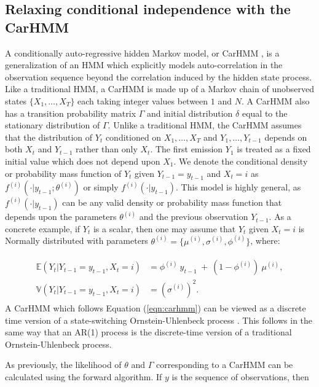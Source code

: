 \subsection{Relaxing conditional independence with the CarHMM}
\label{subsec:CarHMM}

A conditionally auto-regressive hidden Markov model, or CarHMM \citep{Lawler:2019}, is a generalization of an HMM which explicitly models auto-correlation in the observation sequence beyond the correlation induced by the hidden state process. Like a traditional HMM, a CarHMM is made up of a Markov chain of unobserved states $\{X_1,\ldots,X_T\}$ each taking integer values between $1$ and $N$. A CarHMM also has a transition probability matrix $\Gamma$ and initial distribution $\delta$ equal to the stationary distribution of $\Gamma$. Unlike a traditional HMM, the CarHMM assumes that the distribution of $Y_t$ conditioned on $X_1,\ldots, X_T$ and $Y_1,\ldots, Y_{t-1}$ depends on both $X_t$ and $Y_{t-1}$ rather than only $X_t$. The first emission $Y_1$ is treated as a fixed initial value which does not depend upon $X_1$. We denote the conditional density or probability mass function of $Y_t$ given $Y_{t-1} = y_{t-1}$ and $X_t=i$ as $f^{(i)}(\cdot | y_{t-1}; \theta^{(i)})$ or simply $f^{(i)}(\cdot | y_{t-1})$. This model is highly general, as $f^{(i)}(\cdot | y_{t-1})$ can be any valid density or probability mass function that depends upon the parameters $\theta^{(i)}$ and the previous observation $Y_{t-1}$. 
As a concrete example, if $Y_t$ is a scalar, then one may assume that $Y_t$ given $X_t = i$ is Normally distributed with parameters $\theta^{(i)} = \{\mu^{(i)},\sigma^{(i)},\phi^{(i)}\}$, where:

\begin{align}
\label{eqn:carhmm}
    \begin{split}
    \mathbb{E}(Y_{t}|Y_{t-1} = y_{t-1},X_t=i) &= \phi^{(i)} ~ y_{t-1} ~+ ~(1-\phi^{(i)})  ~\mu^{(i)}, \\
    \mathbb{V}(Y_t| Y_{t-1} = y_{t-1},X_t=i) &= (\sigma^{(i)})^2.
    \end{split}
\end{align}
%
A CarHMM which follows Equation (\ref{eqn:carhmm}) can be viewed as a discrete time version of a state-switching Ornstein-Uhlenbeck process \citep{Michelot:2019}. This follows in the same way that an AR(1) process is the discrete-time version of a traditional Ornstein-Uhlenbeck process. 

As previously, the likelihood of $\theta$ and $\Gamma$ corresponding to a CarHMM can be calculated using the forward algorithm. If $y$ is the sequence of observations, then

